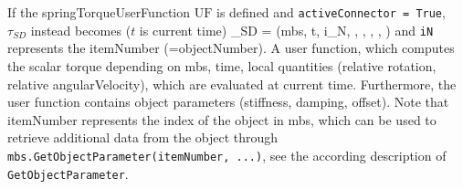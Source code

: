     If the springTorqueUserFunction $\mathrm{UF}$ is defined and \texttt{activeConnector = True}, 
    $\tau_{SD}$ instead becomes ($t$ is current time)
    \be
      \tau_{SD} = (mbs, t, i_N, \Delta\theta, \Delta\omega, , , )
    \ee
    and \texttt{iN} represents the itemNumber (=objectNumber).
    A user function, which computes the scalar torque depending on mbs, time, local quantities 
    (relative rotation, relative angularVelocity), which are evaluated at current time. 
    Furthermore, the user function contains object parameters (stiffness, damping, offset).
    Note that itemNumber represents the index of the object in mbs, which can be used to retrieve additional data from the object through
    \texttt{mbs.GetObjectParameter(itemNumber, ...)}, see the according description of \texttt{GetObjectParameter}.
    

